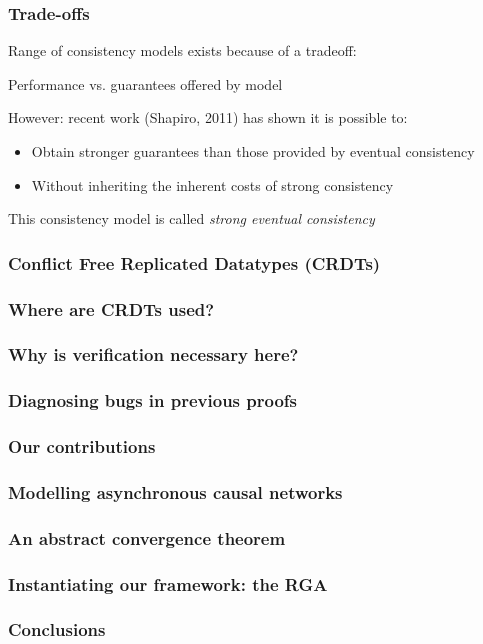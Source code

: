 \documentclass[professionalfonts,smallfonts]{beamer}
\begin{document}
\begin{frame}
\frametitle{Trade-offs}
Range of consistency models exists because of a tradeoff:
\begin{center}
Performance vs. guarantees offered by model
\end{center}
\vspace{\baselineskip}
However: recent work (Shapiro, 2011) has shown it is possible to:
\begin{itemize}
\item
Obtain stronger guarantees than those provided by eventual consistency
\item
Without inheriting the inherent costs of strong consistency
\end{itemize}
\vspace{\baselineskip}
This consistency model is called \emph{strong eventual consistency}
\end{frame}

\begin{frame}
\frametitle{Conflict Free Replicated Datatypes (CRDTs)}
\end{frame}

\begin{frame}
\frametitle{Where are CRDTs used?}
\end{frame}

\begin{frame}
\frametitle{Why is verification necessary here?}
\end{frame}

\begin{frame}
\frametitle{Diagnosing bugs in previous proofs}
\end{frame}

\begin{frame}
\frametitle{Our contributions}
\end{frame}

\begin{frame}
\frametitle{Modelling asynchronous causal networks}
\end{frame}

\begin{frame}
\frametitle{An abstract convergence theorem}
\end{frame}

\begin{frame}
\frametitle{Instantiating our framework: the RGA}
\end{frame}

\begin{frame}
\frametitle{Conclusions}
\end{frame}
\end{document}
